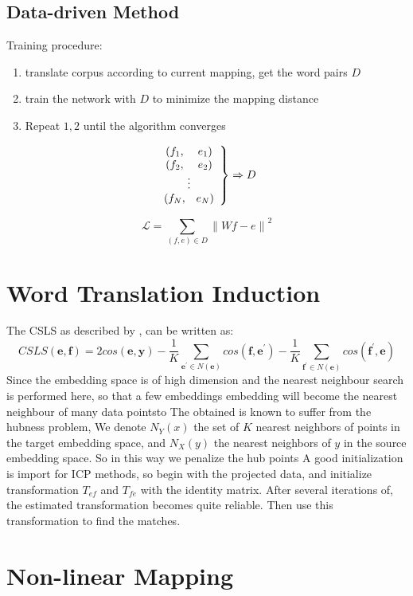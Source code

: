 \subsection{Data-driven Method}
Training procedure:
\begin{enumerate}
	\item translate corpus according to current mapping, get the word pairs $D$
	\item train the network with $D$ to minimize the mapping distance
	\item Repeat $1,2$ until the algorithm converges
\end{enumerate}
		\[ 
		\left. \begin{array}{c c} 
		(f_1,& e_1)\\
		(f_2,& e_2)\\
		\multicolumn{2}{c}{\vdots}\\
		(f_N,& e_N)
		\end{array} \right\} 
		\Rightarrow D
		\]

		\[\mathcal{L} = \sum_{(f,e)\in D} {\lVert Wf - e \rVert}^2  \]

\section{Word Translation Induction}
The CSLS as described by \cite{conneau2017word}, can be written as:
\[ CSLS(\bm{e}, \bm{f}) = 2 cos(\bm{e}, \bm{y}) - \frac{1}{K} \sum_{\bm{e^{\prime}} \in N(\bm{e})} cos(\bm{f}, \bm{e^{\prime}})- \frac{1}{K} \sum_{\bm{f^{\prime}} \in N(\bm{e})} cos(\bm{f^{\prime}}, \bm{e}) \]
Since the embedding space is of high dimension and the nearest neighbour search is performed here, so that a few embeddings embedding will become the nearest neighbour of many data pointsto The obtained is known to suffer from the hubness problem, 
We denote ${N_Y(x)}$ the set of ${K}$ nearest neighbors of points in the target embedding space, and ${N_X(y)}$ the nearest neighbors of ${y}$ in the source embedding space. 
So in this way we penalize the hub points
A good initialization is import for ICP methods, so begin with the projected data, and initialize transformation ${T_{ef}}$ and ${T_{fe}}$ with the identity matrix.
After several iterations of, the estimated transformation becomes quite reliable.  Then use this transformation to find the matches.

\section{Non-linear Mapping}
